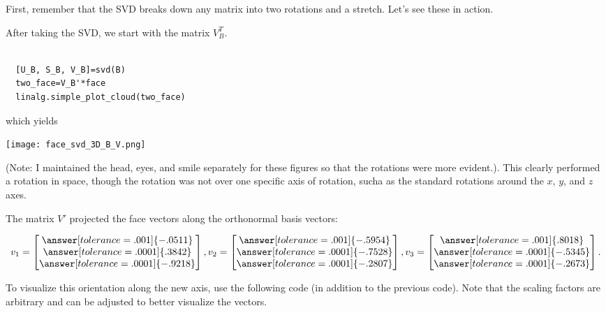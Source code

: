 \documentclass{ximera}
\begin{document}
\begin{problem}

First, remember that the SVD breaks down any matrix into two rotations and a stretch. Let's see these in action.

After taking the SVD, we start with the matrix $V_B^T$.

\begin{verbatim}

  [U_B, S_B, V_B]=svd(B)
  two_face=V_B'*face
  linalg.simple_plot_cloud(two_face)

\end{verbatim}

which yields

\begin{center}
  \texttt{[image: face\_svd\_3D\_B\_V.png]}
\end{center}

(Note: I maintained the head, eyes, and smile separately for these figures so that the rotations were more evident.). This clearly performed a rotation in space, though the rotation was not over one specific axis of rotation, sucha as the standard rotations around the $x$, $y$, and $z$ axes.

The matrix $V'$ projected the face vectors along the orthonormal basis vectors: 

$$v_1=\begin{bmatrix}\answer[tolerance=.001]{-.0511}\\\answer[tolerance=.0001]{.3842}\\\answer[tolerance=.0001]{-.9218}\end{bmatrix}, v_2=\begin{bmatrix}\answer[tolerance=.001]{-.5954}\\\answer[tolerance=.0001]{-.7528}\\\answer[tolerance=.0001]{-.2807}\end{bmatrix}, v_3=\begin{bmatrix}\answer[tolerance=.001]{.8018}\\\answer[tolerance=.0001]{-.5345}\\\answer[tolerance=.0001]{-.2673}\end{bmatrix}.$$

\begin{feedback}
To visualize this orientation along the new axis, use the following code (in addition to the previous code). Note that the scaling factors are arbitrary and can be adjusted to better visualize the vectors.


\end{feedback}
\end{problem}
\end{document}
